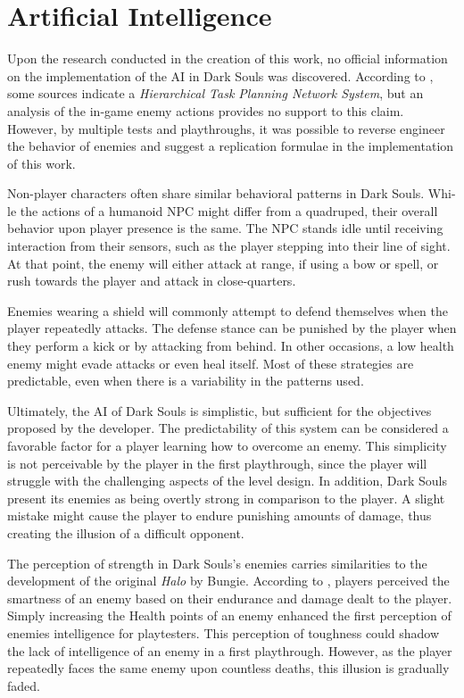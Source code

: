 \section{Artificial Intelligence}

Upon the research conducted in the creation of this work, no official information on the implementation of the AI in Dark Souls was discovered. According to , some sources indicate a \emph{Hierarchical Task Planning Network System}, but an analysis of the in-game enemy actions provides no support to this claim. However, by multiple tests and playthroughs, it was possible to reverse engineer the behavior of enemies and suggest a replication formulae in the implementation of this work.

Non-player characters often share similar behavioral patterns in Dark Souls. Whi\hyp{}le the actions of a humanoid NPC might differ from a quadruped, their overall behavior upon player presence is the same. The NPC stands idle until receiving interaction from their sensors, such as the player stepping into their line of sight. At that point, the enemy will either attack at range, if using a bow or spell, or rush towards the player and attack in close-quarters.

Enemies wearing a shield will commonly attempt to defend themselves when the player repeatedly attacks. The defense stance can be punished by the player when they perform a kick or by attacking from behind. In other occasions, a low health enemy might evade attacks or even heal itself. Most of these strategies are predictable, even when there is a variability in the patterns used.

Ultimately, the AI of Dark Souls is simplistic, but sufficient for the objectives proposed by the developer. The predictability of this system can be considered a favorable factor for a player learning how to overcome an enemy. This simplicity is not perceivable by the player in the first playthrough, since the player will struggle with the challenging aspects of the level design. In addition, Dark Souls present its enemies as being overtly strong in comparison to the player. A slight mistake might cause the player to endure punishing amounts of damage, thus creating the illusion of a difficult opponent.

The perception of strength in Dark Souls's enemies carries similarities to the development of the original \emph{Halo} by Bungie. According to , players perceived the smartness of an enemy based on their endurance and damage dealt to the player. Simply increasing the Health points of an enemy enhanced the first perception of enemies intelligence for playtesters. This perception of toughness could shadow the lack of intelligence of an enemy in a first playthrough. However, as the player repeatedly faces the same enemy upon countless deaths, this illusion is gradually faded.


